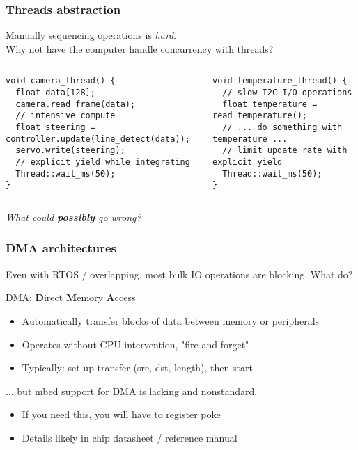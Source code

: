 \documentclass{beamer}
\begin{document}
\begin{frame}[fragile]
\frametitle{Threads abstraction}
Manually sequencing operations is \textit{hard}. \\
Why not have the computer handle concurrency with threads?
\begin{columns}[t]
{\tiny \begin{lstlisting}
void camera_thread() {
  float data[128];
  camera.read_frame(data);
  // intensive compute
  float steering = controller.update(line_detect(data));
  servo.write(steering);
  // explicit yield while integrating
  Thread::wait_ms(50);
}
\end{lstlisting}
}
{\tiny \begin{lstlisting}
void temperature_thread() {
  // slow I2C I/O operations
  float temperature = read_temperature();
  // ... do something with temperature ...
  // limit update rate with explicit yield
  Thread::wait_ms(50);
}
\end{lstlisting}
}
\end{columns}
\textit{What could \textbf{possibly} go wrong?}
\end{frame}


\begin{frame}
\frametitle{DMA architectures}
Even with RTOS / overlapping, most bulk IO operations are blocking. What do? \\
\hfill \break
{} {
DMA: \textbf{D}irect \textbf{M}emory \textbf{A}ccess
\begin{itemize}
  \item Automatically transfer blocks of data between memory or peripherals
  \item Operates without CPU intervention, "fire and forget"
  \item Typically: set up transfer (src, dst, length), then start
\end{itemize}
\hfill \break
... but mbed support for DMA is lacking and nonstandard.
\begin{itemize}
  \item If you need this, you will have to register poke
  \item Details likely in chip datasheet / reference manual
\end{itemize}
}
\end{frame}
\end{document}
